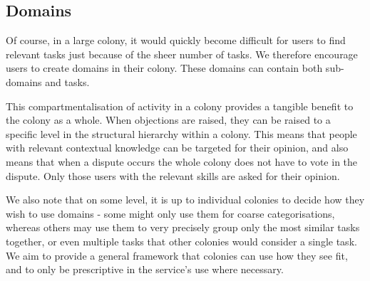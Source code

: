 \subsection{Domains}\label{sec:domains}

Of course, in a large colony, it would quickly become difficult for users to find relevant tasks just because of the sheer number of tasks. We therefore encourage users to create domains in their colony. These domains can contain both sub-domains and tasks. 

This compartmentalisation of activity in a colony provides a tangible benefit to the colony as a whole. When objections are raised, they can be raised to a specific level in the structural hierarchy within a colony. This means that people with relevant contextual knowledge can be targeted for their opinion, and also means that when a dispute occurs the whole colony does not have to vote in the dispute. Only those users with the relevant skills are asked for their opinion.

We also note that on some level, it is up to individual colonies to decide how they wish to use domains - some might only use them for coarse categorisations, whereas others may use them to very precisely group only the most similar tasks together, or even multiple tasks that other colonies would consider a single task. We aim to provide a general framework that colonies can use how they see fit, and to only be prescriptive in the service's use where necessary.


